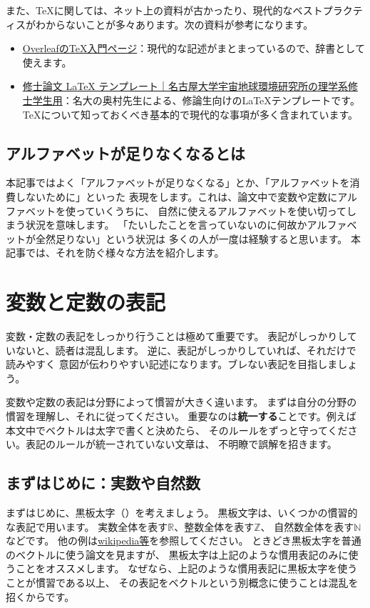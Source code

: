 \documentclass[uplatex,twocolumn,9pt,dvipdfmx]{jsarticle}
\begin{document}
また、TeXに関しては、ネット上の資料が古かったり、現代的なベストプラクティスがわからないことが多々あります。次の資料が参考になります。
\begin{itemize}
    \item \href{https://www.overleaf.com/learn/latex/Main_Page}{OverleafのTeX入門ページ}：現代的な記述がまとまっているので、辞書として使えます。
    \item \href{https://github.com/akira-okumura/MasterThesisTemplate}{修士論文 LaTeX テンプレート｜名古屋大学宇宙地球環境研究所の理学系修士学生用}：名大の奥村先生による、修論生向けのLaTeXテンプレートです。TeXについて知っておくべき基本的で現代的な事項が多く含まれています。
\end{itemize}



\subsection{アルファベットが足りなくなるとは}
本記事ではよく「アルファベットが足りなくなる」とか、「アルファベットを消費しないために」といった
表現をします。これは、論文中で変数や定数にアルファベットを使っていくうちに、
自然に使えるアルファベットを使い切ってしまう状況を意味します。
「たいしたことを言っていないのに何故かアルファベットが全然足りない」という状況は
多くの人が一度は経験すると思います。
本記事では、それを防ぐ様々な方法を紹介します。






\section{変数と定数の表記}
変数・定数の表記をしっかり行うことは極めて重要です。
表記がしっかりしていないと、読者は混乱します。
逆に、表記がしっかりしていれば、それだけで読みやすく
意図が伝わりやすい記述になります。ブレない表記を目指しましょう。

変数や定数の表記は分野によって慣習が大きく違います。
まずは自分の分野の慣習を理解し、それに従ってください。
重要なのは\textbf{統一する}ことです。例えば本文中でベクトルは太字で書くと決めたら、
そのルールをずっと守ってください。表記のルールが統一されていない文章は、
不明瞭で誤解を招きます。


\subsection{まずはじめに：実数や自然数}
まずはじめに、黒板太字（\texttt{\mathbb}）を考えましょう。
黒板文字は、いくつかの慣習的な表記で用います。
実数全体を表す$\mathbb{R}$、整数全体を表す$\mathbb{Z}$、
自然数全体を表す$\mathbb{N}$などです。
他の例は\href{https://en.wikipedia.org/wiki/Blackboard_bold}{wikipedia等}を参照してください。
ときどき黒板太字を普通のベクトルに使う論文を見ますが、
黒板太字は上記のような慣用表記のみに使うことをオススメします。
なぜなら、上記のような慣用表記に黒板太字を使うことが慣習である以上、
その表記をベクトルという別概念に使うことは混乱を招くからです。
\end{document}

